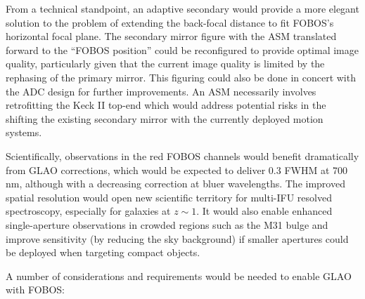 \documentclass[11pt,a4paper,twoside,onecolumn,openany,final,oldfontcommands]{memoir}
\begin{document}
From a technical standpoint, an adaptive secondary would provide a more elegant solution to the problem of extending the back-focal distance to fit FOBOS's horizontal focal plane.  The secondary mirror figure with the ASM translated forward to the ``FOBOS position'' could be reconfigured to provide optimal image quality, particularly given that the current image quality is limited by the rephasing of the primary mirror.  This figuring could also be done in concert with the ADC design for further improvements.  An ASM necessarily involves retrofitting the Keck II top-end which would address potential risks in the shifting the existing secondary mirror with the currently deployed motion systems.

Scientifically, observations in the red FOBOS channels would benefit dramatically from GLAO corrections, which would be expected to deliver 0.3\arcsec{} FWHM at 700 nm, although with a decreasing correction at bluer wavelengths.  The improved spatial resolution would open new scientific territory for multi-IFU resolved spectroscopy, especially for galaxies at $z \sim 1$.  It would also enable enhanced single-aperture observations in crowded regions such as the M31 bulge and improve sensitivity (by reducing the sky background) if smaller apertures could be deployed when targeting compact objects.

A number of considerations and requirements would be needed to enable GLAO with FOBOS:
\end{document}
